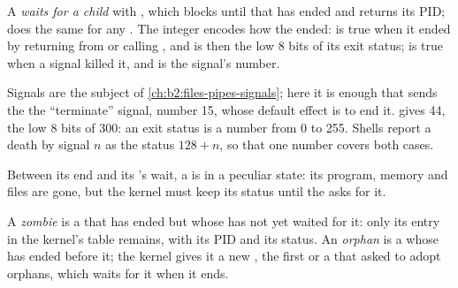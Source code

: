 \begin{definition}\label{def:b2:processes-and-system-calls:wait}
A  \emph{waits for a child} with , which blocks
until that  has ended and returns its PID;  does the same for any . The integer
 encodes how the  ended:  is true when it ended by returning from
 or calling , and  is then the low 8 bits of its exit status;
 is true when a signal killed it, and  is the signal's number.
\end{definition}


\label{out:b2:processes-and-system-calls:status}

Signals are the subject of \cref{ch:b2:files-pipes-signals}; here it is enough that  sends the
 the ``terminate'' signal, number 15, whose default effect is to end it.  gives 44, the low
8 bits of 300: an exit status is a number from 0 to 255. Shells report a death by signal $n$ as the status
$128 + n$, so that one number covers both cases.

Between its end and its 's wait, a  is in a peculiar state: its program, memory and files are gone, but
the kernel must keep its status until the  asks for it.

\begin{definition}\label{def:b2:processes-and-system-calls:zombie}
A \emph{zombie} is a  that has ended but whose  has not yet waited for it: only
its entry in the kernel's  table remains, with its PID and its status. An \emph{orphan} is a  whose  has ended before it; the kernel gives it a new , the first  or a
 that asked to adopt orphans, which waits for it when it ends.
\end{definition}

